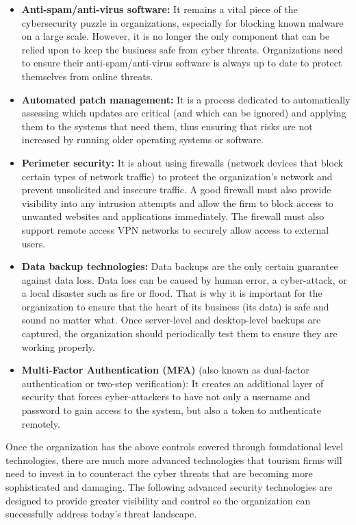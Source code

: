 \documentclass[
  letterpaper,
  DIV=11,
  numbers=noendperiod]{scrreprt}
\begin{document}
\begin{itemize}
\item
  \textbf{Anti-spam/anti-virus software:} It remains a vital piece of
  the cybersecurity puzzle in organizations, especially for blocking
  known malware on a large scale. However, it is no longer the only
  component that can be relied upon to keep the business safe from cyber
  threats. Organizations need to ensure their anti-spam/anti-virus
  software is always up to date to protect themselves from online
  threats.
\item
  \textbf{Automated patch management:} It is a process dedicated to
  automatically assessing which updates are critical (and which can be
  ignored) and applying them to the systems that need them, thus
  ensuring that risks are not increased by running older operating
  systems or software.
\item
  \textbf{Perimeter security:} It is about using firewalls (network
  devices that block certain types of network traffic) to protect the
  organization's network and prevent unsolicited and insecure traffic. A
  good firewall must also provide visibility into any intrusion attempts
  and allow the firm to block access to unwanted websites and
  applications immediately. The firewall must also support remote access
  VPN networks to securely allow access to external users.
\item
  \textbf{Data backup technologies:} Data backups are the only certain
  guarantee against data loss. Data loss can be caused by human error, a
  cyber-attack, or a local disaster such as fire or flood. That is why
  it is important for the organization to ensure that the heart of its
  business (its data) is safe and sound no matter what. Once
  server-level and desktop-level backups are captured, the organization
  should periodically test them to ensure they are working properly.
\item
  \textbf{Multi-Factor Authentication (MFA)} (also known as dual-factor
  authentication or two-step verification): It creates an additional
  layer of security that forces cyber-attackers to have not only a
  username and password to gain access to the system, but also a token
  to authenticate remotely.
\end{itemize}

Once the organization has the above controls covered through
foundational level technologies, there are much more advanced
technologies that tourism firms will need to invest in to counteract the
cyber threats that are becoming more sophisticated and damaging. The
following advanced security technologies are designed to provide greater
visibility and control so the organization can successfully address
today's threat landscape.
\end{document}
